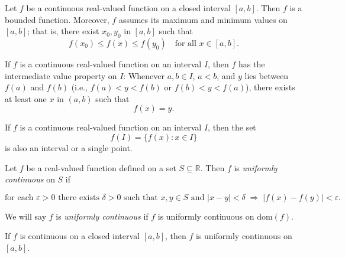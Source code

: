 \documentclass[12pt]{article}
\newenvironment{definitionbox}[1][]%
{\begin{tcolorbox}[definitionstyle,title={#1}]}%
{\end{tcolorbox}}
\newenvironment{theorembox}[1][]%
{\begin{tcolorbox}[theoremstyle,title={#1}]}%
{\end{tcolorbox}}
\begin{document}
\begin{theorembox}[Theorem 18.1 — Extreme Value Theorem]
\label{thm:18.1}
Let $f$ be a continuous real-valued function on a closed interval $[a,b]$.  
Then $f$ is a bounded function. Moreover, $f$ assumes its maximum and minimum
values on $[a,b]$; that is, there exist $x_{0}, y_{0}$ in $[a,b]$ such that  
\[
  f(x_{0}) \le f(x) \le f(y_{0}) \quad \text{for all } x \in [a,b].
\]
\end{theorembox}

\begin{theorembox}[Theorem 18.2 — Intermediate Value Theorem]
\label{thm:18.2}
If $f$ is a continuous real-valued function on an interval $I$, then $f$ has  
the intermediate value property on $I$: Whenever $a,b \in I$, $a < b$, and $y$  
lies between $f(a)$ and $f(b)$ (i.e., $f(a) < y < f(b)$ or $f(b) < y < f(a)$),  
there exists at least one $x$ in $(a,b)$ such that  
\[
  f(x) = y.
\]
\end{theorembox}

\begin{theorembox}[Corollary 18.3]
\label{thm:18.3}
If $f$ is a continuous real-valued function on an interval $I$, then the set  
\[
  f(I) = \{ f(x) : x \in I \}
\]
is also an interval or a single point.
\end{theorembox}

\begin{definitionbox}[Definition 19.1 — Uniform Continuity]
\label{def:19.1}
Let $f$ be a real-valued function defined on a set $S \subseteq \mathbb{R}$.  
Then $f$ is \emph{uniformly continuous} on $S$ if  

\[
\text{for each } \varepsilon > 0 \text{ there exists } \delta > 0 \text{ such that }  
x,y \in S \text{ and } |x-y| < \delta \;\Rightarrow\; |f(x)-f(y)| < \varepsilon.
\]

We will say $f$ is \emph{uniformly continuous} if $f$ is uniformly continuous  
on $\mathrm{dom}(f)$.
\end{definitionbox}

\begin{theorembox}[Theorem 19.2]
\label{thm:19.2}
If $f$ is continuous on a closed interval $[a,b]$,  
then $f$ is uniformly continuous on $[a,b]$.
\end{theorembox}
\end{document}
